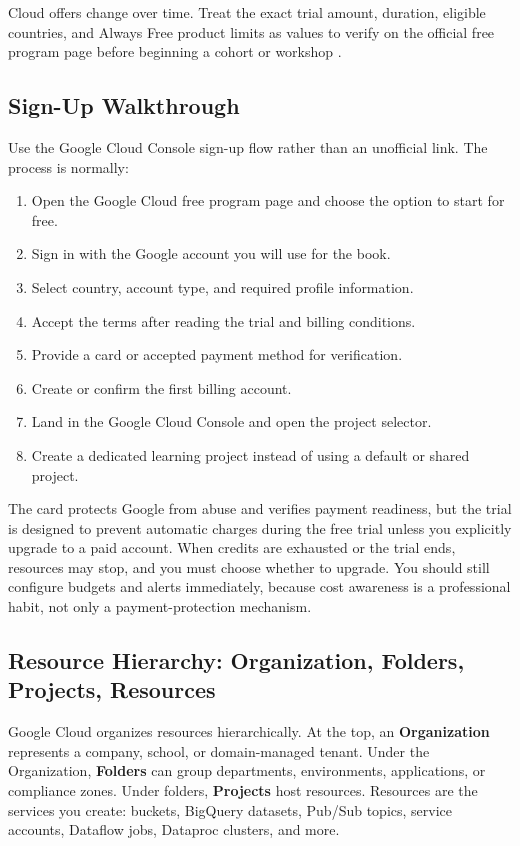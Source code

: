 \begin{notebox}
Cloud offers change over time. Treat the exact trial amount, duration, eligible countries, and Always Free product limits as values to verify on the official free program page before beginning a cohort or workshop \cite{googlecloudfreeprogram}.
\end{notebox}

\subsection{Sign-Up Walkthrough}
Use the Google Cloud Console sign-up flow rather than an unofficial link. The process is normally:

\begin{enumerate}
    \item Open the Google Cloud free program page and choose the option to start for free.
    \item Sign in with the Google account you will use for the book.
    \item Select country, account type, and required profile information.
    \item Accept the terms after reading the trial and billing conditions.
    \item Provide a card or accepted payment method for verification.
    \item Create or confirm the first billing account.
    \item Land in the Google Cloud Console and open the project selector.
    \item Create a dedicated learning project instead of using a default or shared project.
\end{enumerate}

The card protects Google from abuse and verifies payment readiness, but the trial is designed to prevent automatic charges during the free trial unless you explicitly upgrade to a paid account. When credits are exhausted or the trial ends, resources may stop, and you must choose whether to upgrade. You should still configure budgets and alerts immediately, because cost awareness is a professional habit, not only a payment-protection mechanism.

\subsection{Resource Hierarchy: Organization, Folders, Projects, Resources}
Google Cloud organizes resources hierarchically. At the top, an \textbf{Organization} represents a company, school, or domain-managed tenant. Under the Organization, \textbf{Folders} can group departments, environments, applications, or compliance zones. Under folders, \textbf{Projects} host resources. Resources are the services you create: buckets, BigQuery datasets, Pub/Sub topics, service accounts, Dataflow jobs, Dataproc clusters, and more.

